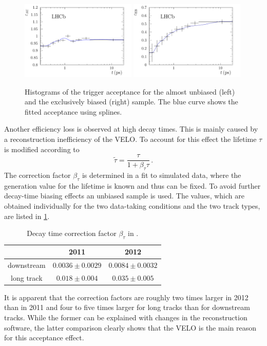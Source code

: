 \begin{figure}[htb]
\includegraphics[width=0.49\textwidth]{06-Bd2JpsiKS/tikz/pdf/Acceptancespline_zoomed_hlt2.pdf}
\includegraphics[width=0.49\textwidth]{06-Bd2JpsiKS/tikz/pdf/Acceptancespline_zoomed_hlt1.pdf}
\caption{Histograms of the trigger acceptance for the almost unbiased (left) and the
exclusively biased (right) sample. The blue curve shows the fitted acceptance
using splines.}
\label{fig:bd2jpsiks:decaytime:acceptance:splines}
\end{figure}

Another efficiency loss is observed at high decay times. This is mainly caused
by a reconstruction inefficiency of the VELO. To account for this effect the
lifetime $\tau$ is modified according to
\begin{equation}
  \widetilde{\tau} = \frac{\tau}{1 + \beta_\tau \tau}\,. 
\end{equation}
The correction factor $\beta_\tau$ is determined in a fit to simulated data,
where the generation value for the lifetime is known and thus can be fixed. To
avoid further decay-time biasing effects an unbiased sample is used. The
values, which are obtained individually for the two data-taking conditions and
the two track types, are listed in
\cref{tab:bd2jpsiks:decaytime:acceptance:beta}.
\begin{table}[htb]
	\centering
	\caption{Decay time correction factor $\beta_\tau$ in \si{\invps}.}
	\begin{tabular}{ccc}
		\toprule
		 & 2011 & 2012 \\
		\midrule
		downstream & $0.0036\pm0.0029$ & $0.0084\pm0.0032$ \\
		long track & $0.018\pm0.004$   & $0.035\pm0.005$ \\
		\bottomrule
	\end{tabular}
	\label{tab:bd2jpsiks:decaytime:acceptance:beta}
\end{table}
It is apparent that the correction factors are roughly two times larger in
2012 than in 2011 and four to five times larger for long tracks than for
downstream tracks. While the former can be explained with changes in the
reconstruction software, the latter comparison clearly shows that the VELO is
the main reason for this acceptance effect.